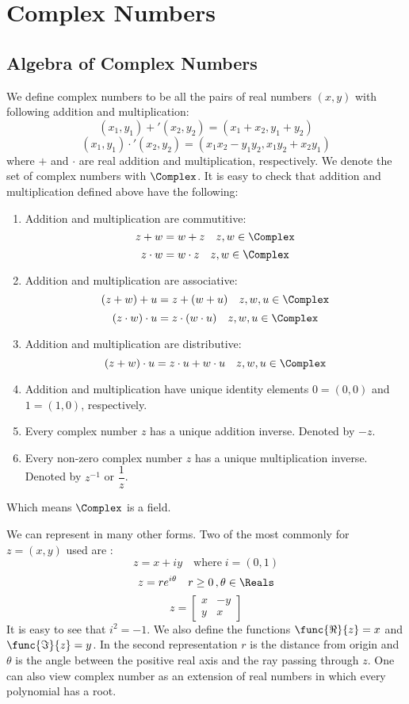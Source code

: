 \chapter{Complex Numbers}
\section{Algebra of Complex Numbers}
We define complex numbers to be all the pairs of real numbers \((x,y)\) with following addition and multiplication:
\[(x_1,y_1) +' (x_2,y_2) = (x_1 + x_2 , y_1 + y_2)\]
\[ (x_1,y_1) \cdot' (x_2,y_2) = (x_1x_2 - y_1y_2, x_1y_2 + x_2y_1)\]
where \(+\) and \(\cdot\) are real addition and multiplication, respectively.
We denote the set of complex numbers with \(\Complex\).
It is easy to check that addition and multiplication defined above have the following:
\begin{enumerate}
        \item Addition and multiplication are commutitive:
              \[z + w = w + z \quad z,w \in \Complex\]
              \[ z\cdot w = w \cdot z \quad z,w \in \Complex\]

        \item Addition and multiplication are associative:
              \[(z + w) + u = z + (w + u) \quad z,w,u \in \Complex\]
              \[ (z \cdot w) \cdot u = z \cdot (w \cdot u) \quad z,w,u \in \Complex\]
        \item Addition and multiplication are distributive:
              \[(z + w) \cdot u = z \cdot u + w \cdot u \quad z,w,u \in \Complex\]
        \item Addition and multiplication have unique identity elements \(0 = (0,0)\) and \(1 = (1,0)\), respectively.
        \item Every complex number \(z\) has a unique addition inverse. Denoted by \(-z\).
        \item Every non-zero complex number \(z\) has a unique multiplication inverse. Denoted by \(z^{-1}\) or \(\dfrac{1}{z}\).
\end{enumerate}
Which means \(\Complex\) is a field. 

We can represent in many other forms. Two of the most commonly for \(z = (x,y)\) used are :
\[ z = x + iy \quad \text{where} \; i = (0,1)\]
\[ z = re^{i\theta} \quad r \geq 0 \,, \theta \in \Reals \]
\[ z = \begin{bmatrix}
                x & -y \\
                y & x
        \end{bmatrix} \]
It is easy to see that \(i^2 = -1\). We also define the functions \(\func{\Re}{z} = x\) and \(\func{\Im}{z} = y\). In the second representation \(r\) is the distance from origin and \(\theta\) is the angle between the positive real axis and the ray passing through \(z\). One can also view complex number as an extension of real numbers in which every polynomial has a root.

